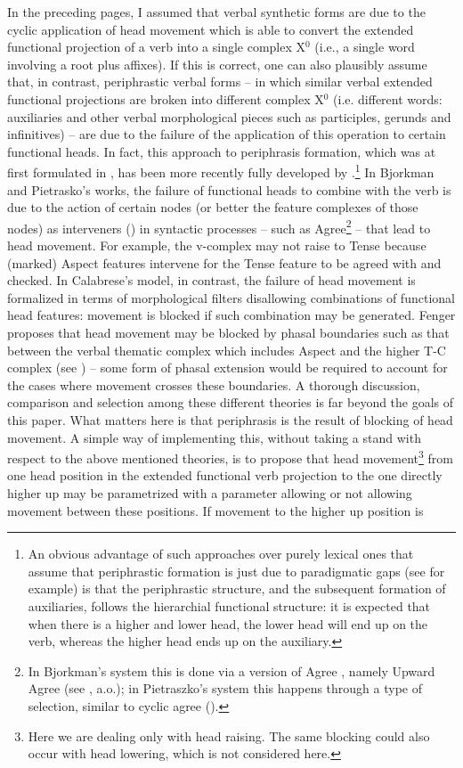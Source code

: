 \documentclass[output=paper]{langscibook}
\begin{document}
In the preceding pages, I assumed that verbal synthetic forms are due to the cyclic application of head movement which is able to convert the extended functional projection of a verb into a single complex X$^0$ (i.e., a single word involving a root plus affixes). If this is correct, one can also plausibly assume that, in contrast, periphrastic verbal forms  --  in which similar verbal extended functional projections are broken into different complex X$^0$ (i.e. different words: auxiliaries and other verbal morphological pieces such as participles, gerunds and infinitives)  --  are due to the failure of the application of this operation to certain functional heads. In fact, this approach to periphrasis formation, which was at first formulated in \citet{embick2000a}, has been more recently fully developed by \citet{bjorkman2011a, pietraszko2016a, fenger2020a, calabrese2019a}.\footnote{An obvious advantage of such approaches over purely lexical ones that assume that periphrastic formation is just due to paradigmatic gaps (see \citealt{kiparsky2004a} for example) is that the periphrastic structure, and the subsequent formation of auxiliaries, follows the hierarchial functional structure: it is expected that when there is a higher and lower head, the lower head will end up on the verb, whereas the higher head ends up on the auxiliary.}  In Bjorkman and Pietrasko’s works, the failure of functional heads to combine with the verb is due to the action of certain nodes (or better the feature complexes of those nodes) as interveners (\citealt{rizzi1990a}) in syntactic processes  --  such as Agree\footnote{In Bjorkman’s system this is done via a version of Agree \citep{chomsky2000a, Chomsky01}, namely Upward Agree (see \citealt{merchant2011a}, a.o.); in Pietraszko’s system this happens through a type of selection, similar to cyclic agree (\citealt{bejar2009a}).}   --  that lead to head movement. For example, the v-complex may not raise to Tense because (marked) Aspect features intervene for the Tense feature to be agreed with and checked. In Calabrese’s model, in contrast, the failure of head movement is formalized in terms of morphological filters disallowing combinations of functional head features: movement is blocked if such combination may be generated. Fenger proposes that head movement may be blocked by phasal boundaries such as that between the verbal thematic complex which includes Aspect and the higher T-C complex (see \citealt{bo2014a,wurmbrand2017verb})  --  some form of phasal extension would be required to account for the cases where movement crosses these boundaries.  A thorough discussion, comparison and selection among these different theories is far beyond the goals of this paper.  What matters here is that periphrasis is the result of blocking of head movement. A simple way of implementing this, without taking a stand with respect to the above mentioned theories, is to propose that head movement\footnote{Here we are dealing only with head raising. The same blocking could also occur with head lowering, which is not considered here.}  from one head position in the extended functional verb projection to the one directly higher up may be parametrized with a parameter allowing or not allowing movement between these positions. If movement to the higher up position is 
\end{document}

